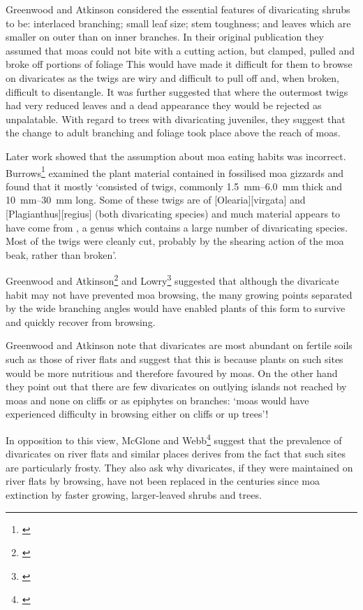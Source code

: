 Greenwood and Atkinson considered the essential features of divaricating shrubs to be: interlaced branching; small leaf size; stem toughness; and leaves which are smaller on outer than on inner branches.
In their original publication they assumed that moas could not bite with a cutting action, but clamped, pulled and broke off portions of foliage This would have made it difficult for them to browse on divaricates as the twigs are wiry and difficult to pull off and, when broken, difficult to disentangle.
It was further suggested that where the outermost twigs had very reduced leaves and a dead appearance they would be rejected as unpalatable.
With regard to trees with divaricating juveniles, they suggest that the change to adult branching and foliage took place above the reach of moas.

Later work showed that the assumption about moa eating habits was incorrect.
Burrows\footnote{\cite{burrows1980moas}} examined the plant material contained in fossilised moa gizzards and found that it mostly `consisted of twigs, commonly \SIrange{1.5}{6.0}{\milli\metre} thick and \SIrange{10}{30}{\milli\metre} long.
Some of these twigs are of [Olearia][virgata] and [Plagianthus][regius] (both divaricating species) and much material appears to have come from , a genus which contains a large number of divaricating species.
Most of the twigs were cleanly cut, probably by the shearing action of the moa beak, rather than broken'.

Greenwood and Atkinson\footnote{\cite{atkinson1980divaricating}} and Lowry\footnote{\cite{lowry1980evolution}} suggested that although the divaricate habit may not have prevented moa browsing, the many growing points separated by the wide branching angles would have enabled plants of this form to survive and quickly recover from browsing.

Greenwood and Atkinson note that divaricates are most abundant on fertile soils such as those of river flats and suggest that this is because plants on such sites would be more nutritious and therefore favoured by moas.
On the other hand they point out that there are few divaricates on outlying islands not reached by moas and none on cliffs or as epiphytes on branches: `moas would have experienced difficulty in browsing either on cliffs or up trees'!

In opposition to this view, McGlone and Webb\footnote{\cite{mcglone1981selective}} suggest that the prevalence of divaricates on river flats and similar places derives from the fact that such sites are particularly frosty.
They also ask why divaricates, if they were maintained on river flats by browsing, have not been replaced in the centuries since moa extinction by faster growing, larger-leaved shrubs and trees.

